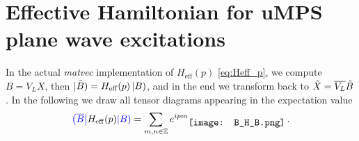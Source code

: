 \section*{Effective Hamiltonian for uMPS plane wave excitations}
In the actual \textit{matvec} implementation of $H_{\mathrm{eff}}(p)$ \eqref{eq:Heff_p}, we compute $B = V_L X$, then $\Tilde{\left| B \right)} = H_{\mathrm{eff}}(p) \left| B \right)$, and in the end we transform back to $\Tilde{X} = \overline{V_L} \Tilde{B}$. In the following we draw all tensor diagrams appearing in the expectation value
\begin{equation*}
	\textcolor{blue}{\tbra{\overline{B}}} H_{\mathrm{eff}}(p) \textcolor{blue}{\tket{B}} = \sum_{m, n \in \mathbb{Z}} e^{ipm} \raisebox{-0.5\height}{\texttt{[image: B\_H\_B.png]}} \hspace{0.2em} .
\end{equation*}

